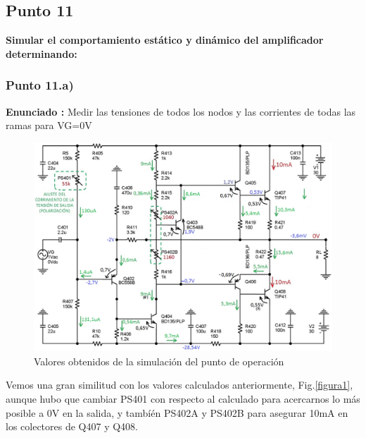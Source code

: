 \documentclass[12pt]{book}
\begin{document}
\subsection{Punto 11}
\textbf{Simular el comportamiento estático y dinámico del amplificador determinando:}\\

\subsubsection{Punto 11.a)}
\textbf{Enunciado : } Medir las tensiones de todos los nodos y las corrientes de todas las ramas para VG=0V\\[1cm]
\begin{figure}[H]
\centering
\includegraphics[scale=0.4]{figuras/11-a-valoresReposo.png}
\caption{Valores obtenidos de la simulación del punto de operación}
\label{figura11a}
\end{figure}
Vemos una gran similitud con los valores calculados anteriormente, Fig.\eqref{figura1}, aunque hubo que cambiar PS401 con respecto al calculado para acercarnos lo más posible a 0V en la salida, y tambíén PS402A y PS402B para asegurar 10mA en los colectores de Q407 y Q408.
\end{document}
